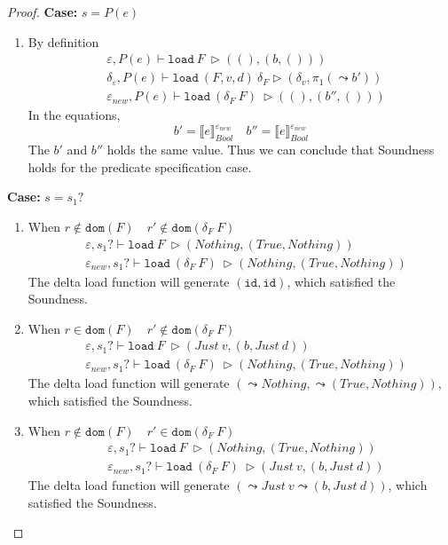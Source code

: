 \documentclass[10pt,twoside,a4paper]{article}
\theoremstyle{theorem}
\theoremstyle{lemma}
\theoremstyle{property}
\theoremstyle{definition}
\theoremstyle{assumption}
\def\fst{\pi_1}
\begin{document}
\begin{proof}
	\textbf{Case: } $s = P(e)$\\
	\begin{enumerate}
	\item
	By definition
	\begin{align*}
		& \varepsilon, P(e) \vdash \mathtt{load}~ F~ \rhd ((),(b,()))\\
		& \delta_\varepsilon, P(e) \vdash \mathtt{load}~ (F,v,d)~ \delta_F \rhd (\delta_v, \fst(\leadsto b'))\\
		& \varepsilon_{new}, P(e) \vdash \mathtt{load}~ (\delta_F~F)~ \rhd ((),(b'',()))
	\end{align*}
	In the equations, 
	\begin{displaymath}
		b' = \llbracket e \rrbracket^{\varepsilon_{new}}_{Bool} \quad b'' = \llbracket e \rrbracket^{\varepsilon_{new}}_{Bool}
	\end{displaymath}
	The $b'$ and $b''$ holds the same value. Thus we can conclude that Soundness holds for the predicate specification case.
	\end{enumerate}

	\textbf{Case: } $s = s_1?$\\
	\begin{enumerate}
	\item
	When $r \notin \mathtt{dom}(F) \quad r' \notin \mathtt{dom}(\delta_F~F)$
	\begin{align*}
		& \varepsilon, s_1? \vdash \mathtt{load}~ F~ \rhd (Nothing,(True, Nothing))\\
		& \varepsilon_{new}, s_1? \vdash \mathtt{load}~ (\delta_F~F)~ \rhd (Nothing,(True, Nothing))
	\end{align*}
	The delta load function will generate $(\mathtt{id}, \mathtt{id})$, which satisfied the Soundness.

	\item
	When $r \in \mathtt{dom}(F) \quad r' \notin \mathtt{dom}(\delta_F~F)$
	\begin{align*}
		& \varepsilon, s_1? \vdash \mathtt{load}~ F~ \rhd (Just ~v, (b, Just ~d))\\
		& \varepsilon_{new}, s_1? \vdash \mathtt{load}~ (\delta_F~F)~ \rhd (Nothing,(True, Nothing))
	\end{align*}
	The delta load function will generate $(\leadsto Nothing, \leadsto (True, Nothing))$, which satisfied the Soundness.

	\item
	When $r \notin \mathtt{dom}(F) \quad r' \in \mathtt{dom}(\delta_F~F)$
	\begin{align*}
		& \varepsilon, s_1? \vdash \mathtt{load}~ F~ \rhd (Nothing,(True, Nothing))\\
		& \varepsilon_{new}, s_1? \vdash \mathtt{load}~ (\delta_F~F)~ \rhd (Just ~v, (b, Just ~d))
	\end{align*}
	The delta load function will generate $(\leadsto Just ~v \leadsto (b, Just ~d))$, which satisfied the Soundness.


\end{enumerate}
\end{proof}
\end{document}
